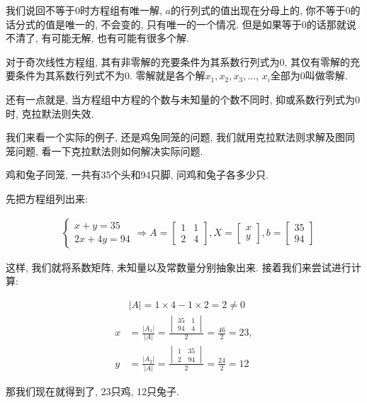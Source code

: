 我们说回不等于0时方程组有唯一解, $a$的行列式的值出现在分母上的, 你不等于0的话分式的值是唯一的, 不会变的, 只有唯一的一个情况. 但是如果等于0的话那就说不清了, 有可能无解, 也有可能有很多个解. 

对于奇次线性方程组, 其有非零解的充要条件为其系数行列式为$0$, 其仅有零解的充要条件为其系数行列式不为$0$. 零解就是各个解$x_1,x_2, x_3, ...$, $x_i$全部为0叫做零解. 

还有一点就是, 当方程组中方程的个数与未知量的个数不同时, 抑或系数行列式为$0$时, 克拉默法则失效. 

我们来看一个实际的例子, 还是鸡兔同笼的问题, 我们就用克拉默法则求解及图同笼问题, 看一下克拉默法则如何解决实际问题. 

鸡和兔子同笼, 一共有35个头和94只脚, 问鸡和兔子各多少只. 

先把方程组列出来: 

\begin{align*}
& \begin{cases}
x + y = 35 \\
2x + 4y = 94
\end{cases}
\Rightarrow
A = 
\begin{bmatrix}
1 & 1 \\
2 & 4
\end{bmatrix},
X = \begin{bmatrix}x \\ y \end{bmatrix}, 
b = \begin{bmatrix} 35 \\ 94 \end{bmatrix}
\end{align*}

这样, 我们就将系数矩阵, 未知量以及常数量分别抽象出来. 接着我们来尝试进行计算: 

\begin{align*}
  & |A| = 1 \times 4 - 1 \times 2 = 2 \ne 0 \\
  x &  = \frac{|A_1|}{|A|} = \frac{\begin{vmatrix} 35 \quad 1 \\ 94 \quad 4 \end{vmatrix}}{2} = \frac{46}{2} = 23, \\
  y & = \frac{|A_2|}{|A|} = \frac{\begin{vmatrix} 1 \quad 35 \\ 2 \quad 94 \end{vmatrix}}{2} = \frac{24}{2} = 12
\end{align*}

那我们现在就得到了, 23只鸡, 12只兔子. 

